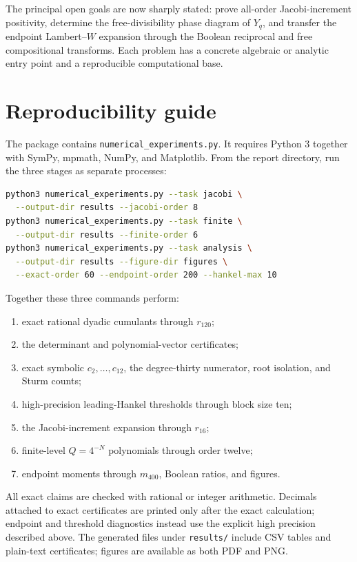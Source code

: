 \documentclass[11pt,oneside]{article}
\theoremstyle{definition}
\theoremstyle{remark}
\begin{document}
The principal open goals are now sharply stated: prove all-order Jacobi-increment positivity, determine the free-divisibility phase diagram of \(Y_q\), and transfer the endpoint Lambert--\(W\) expansion through the Boolean reciprocal and free compositional transforms. Each problem has a concrete algebraic or analytic entry point and a reproducible computational base.

\section{Reproducibility guide}
\label{sec:repro}
The package contains \texttt{numerical\_experiments.py}. It requires Python 3 together with SymPy, mpmath, NumPy, and Matplotlib. From the report directory, run the three stages as separate processes:
\begin{lstlisting}[style=pseudo,language=bash]
python3 numerical_experiments.py --task jacobi \
  --output-dir results --jacobi-order 8
python3 numerical_experiments.py --task finite \
  --output-dir results --finite-order 6
python3 numerical_experiments.py --task analysis \
  --output-dir results --figure-dir figures \
  --exact-order 60 --endpoint-order 200 --hankel-max 10
\end{lstlisting}
Together these three commands perform:
\begin{enumerate}[label=(\arabic*)]
\item exact rational dyadic cumulants through \(r_{120}\);
\item the determinant and polynomial-vector certificates;
\item exact symbolic \(c_2,\ldots,c_{12}\), the degree-thirty numerator, root isolation, and Sturm counts;
\item high-precision leading-Hankel thresholds through block size ten;
\item the Jacobi-increment expansion through \(r_{16}\);
\item finite-level \(Q=4^{-N}\) polynomials through order twelve;
\item endpoint moments through \(m_{400}\), Boolean ratios, and figures.
\end{enumerate}
All exact claims are checked with rational or integer arithmetic.  Decimals
attached to exact certificates are printed only after the exact calculation;
endpoint and threshold diagnostics instead use the explicit high precision
described above.  The generated files under \texttt{results/} include CSV
tables and plain-text certificates; figures are available as both PDF and PNG.
\end{document}
